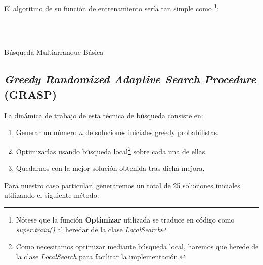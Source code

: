 \documentclass[a4paper, 11pt]{article}
\begin{document}
			El algoritmo de su función de entrenamiento sería tan simple como \footnote{Nótese que la
			función \textbf{Optimizar} utilizada se traduce en código como \textit{super.train()} al
			heredar de la clase \textit{LocalSearch}}:
			
			\begin{algorithm}[H]
				\begin{algorithmic}[1]
				\REQUIRE \ \\
						 \
					\ENDIF
				\ENDFOR
			\end{algorithmic}
		\caption{Búsqueda Multiarranque Básica}
		\label{BMBS}
		\end{algorithm}

		\subsection{\textit{Greedy Randomized Adaptive Search Procedure} (\textbf{GRASP})}
			La dinámica de trabajo de esta técnica de búsqueda consiste en:
			\begin{enumerate}
				\item Generar un número $n$ de soluciones iniciales greedy probabilistas.
				\item Optimizarlas usando búsqueda local\footnote{Como necesitamos optimizar mediante
				búsqueda local, haremos que herede de la clase \textit{LocalSearch} para facilitar
				la implementación.} sobre cada una de ellas.
				\item Quedarnos con la mejor solución obtenida tras dicha mejora.
			\end{enumerate}
			
			Para nuestro caso particular, generaremos un total de 25 soluciones iniciales utilizando
			el siguiente método:
			
\end{document}
